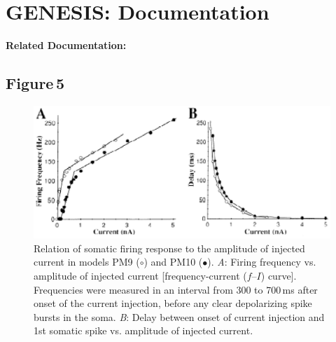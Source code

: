\documentclass[12pt]{article}
\begin{document}
\section*{GENESIS: Documentation}

{\bf Related Documentation:}

\subsection*{Figure\,5}

\begin{figure}[h]
\centering
   \includegraphics[scale=1]{figures/Fig.1.6.eps}
   \caption{Relation of somatic firing response to the amplitude of injected current in models PM9 ($\circ$) and PM10 ($\bullet$). {\it A}: Firing frequency vs. amplitude of injected current [frequency-current ($f$--$I$) curve]. Frequencies were measured in an interval from 300 to 700\,ms after onset of the current injection, before any clear depolarizing spike bursts in the soma. {\it B}: Delay between onset of current injection and 1st somatic spike vs. amplitude of injected current.}
   \label{fig:DS1.6}
\end{figure}



\end{document}
